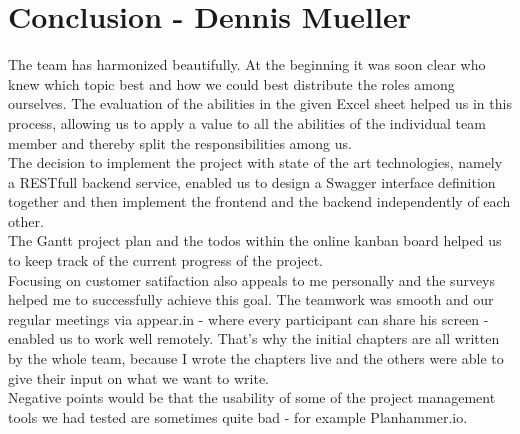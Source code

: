 \section{Conclusion - Dennis Mueller}
The team has harmonized beautifully. At the beginning it was soon clear who knew which topic best and how we could best distribute the roles among ourselves. The evaluation of the abilities in the given Excel sheet helped us in this process, allowing us to apply a value to all the abilities of the individual team member and thereby split the responsibilities among us.
\\
The decision to implement the project with state of the art technologies, namely a RESTfull backend service, enabled us to design a Swagger interface definition together and then implement the frontend and the backend independently of each other.
\\
The Gantt project plan and the todos within the online kanban board helped us to keep track of the current progress of the project.
\\
Focusing on customer satifaction also appeals to me personally and the surveys helped me to successfully achieve this goal.
The teamwork was smooth and our regular meetings via appear.in - where every participant can share his screen - enabled us to work well remotely.
That's why the initial chapters are all written by the whole team, because I wrote the chapters live and the others were able to give their input on what we want to write.
\\
Negative points would be that the usability of some of the project management tools we had tested are sometimes quite bad - for example Planhammer.io.
